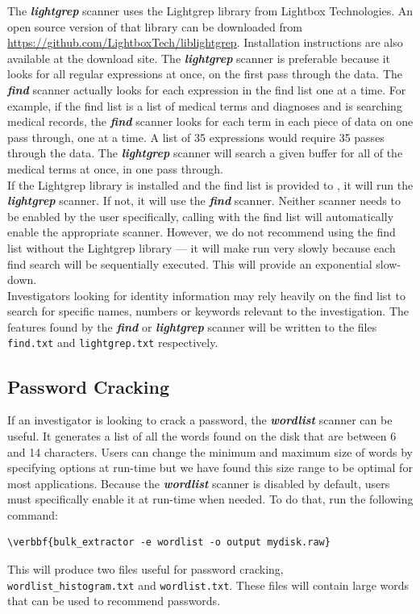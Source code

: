 \documentclass[11pt]{article} %
\begin{document}
The \textbf{\textit{lightgrep}} scanner uses the Lightgrep library from Lightbox Technologies. An open source version of that library can be downloaded from \url{https://github.com/LightboxTech/liblightgrep}. Installation instructions are also available at the download site. The \textbf{\textit{lightgrep}} scanner is preferable because it looks for all regular expressions at once, on the first pass through the data. The \textbf{\textit{find}} scanner actually looks for each expression in the find list one at a time. For example, if the find list is a list of medical terms and diagnoses and \bulk is searching medical records, the \textbf{\textit{find}} scanner looks for each term in each piece of data on one pass through, one at a time. A list of 35 expressions would require 35 passes through the data. The \textbf{\textit{lightgrep}} scanner will search a given buffer for all of the medical terms at once, in one pass through. \\

If the Lightgrep library is installed and the find list is provided to \bulk, it will run the \textbf{\textit{lightgrep}} scanner. If not, it will use the \textbf{\textit{find}} scanner. Neither scanner needs to be enabled by the user specifically, calling \bulk with the find list will automatically enable the appropriate scanner. However, we do not recommend using the find list without the Lightgrep library --- it will make \bulk run very slowly because each find search will be sequentially executed. This will provide an exponential slow-down.\\

Investigators looking for identity information may rely heavily on the find list to search for specific names, numbers or keywords relevant to the investigation. The features found by the \textbf{\textit{find}} or \textbf{\textit{lightgrep}} scanner will be written to the files \texttt{find.txt} and \texttt{lightgrep.txt} respectively.

\subsection{Password Cracking}
\label{PasswordCracking}
If an investigator is looking to crack a password, the \textbf{\textit{wordlist}} scanner can be useful. It generates a list of all the words found on the disk that are between 6 and 14 characters. Users can change the minimum and maximum size of words by specifying options at run-time but we have found this size range to be optimal for most applications. Because the \textbf{\textit{wordlist}} scanner is disabled by default, users must specifically enable it at run-time when needed. To do that, run the following command:
\begin{Verbatim}[commandchars=\\\{\}]
\verbbf{bulk_extractor -e wordlist -o output mydisk.raw}
\end{Verbatim}
This will produce two files useful for password cracking, \texttt{wordlist\_histogram.txt} and \texttt{wordlist.txt}.  These files will contain large words that can be used to recommend passwords.
\end{document}
